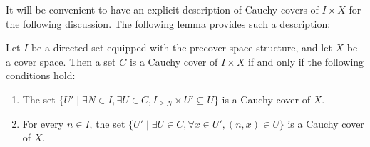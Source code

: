 \documentclass[pdflatex,sn-mathphys-num]{sn-jnl}
\theoremstyle{definition}
\theoremstyle{remark}
\numberwithin{figure}{section}
\begin{document}
It will be convenient to have an explicit description of Cauchy covers of $I \times X$ for the following discussion.
The following lemma provides such a description:

\begin{lem}
Let $I$ be a directed set equipped with the precover space structure, and let $X$ be a cover space.
Then a set $C$ is a Cauchy cover of $I \times X$ if and only if the following conditions hold:
\begin{enumerate}
\item \label{it:dir-char} The set $\{ U' \mid \exists N \in I, \exists U \in C, I_{\geq N} \times U' \subseteq U \}$ is a Cauchy cover of $X$.
\item \label{it:dir-cover} For every $n \in I$, the set $\{ U' \mid \exists U \in C, \forall x \in U', (n,x) \in U \}$ is a Cauchy cover of $X$.
\end{enumerate}
\end{lem}
\end{document}
